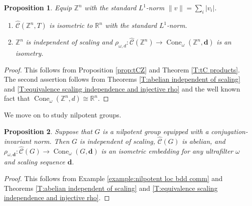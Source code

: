 \documentclass[12pt]{amsart}
\newtheorem{prop}{Proposition}[section]
\theoremstyle{definition}
\def\RR{\ensuremath{\mathbb{R}}}
\def\ZZ{\ensuremath{\mathbb{Z}}}
\newcommand{\B}[1]{\mathbf{#1}}
\newcommand{\OP}[1]{\operatorname{#1}}
\def\Cone{\OP{Cone}}
\def\tC{\hat{\mathcal{C}}}
\begin{document}
\begin{prop}\label{prop:tCZn} %
Equip $\ZZ^n$  with the standard $L^1$-norm $\| v \|=\sum_i|v_i|$.
\begin{enumerate}[label=(\alph*)]
\item
$\tC(\ZZ^n,T)$ is isometric to $\RR^n$ with the standard $L^1$-norm.
\item
$\ZZ^n$ is independent of scaling and $\rho_{\omega,d} \colon \tC(\ZZ^n) \to \Cone_\omega(\ZZ^n,\B d)$ is an isometry.
\end{enumerate}
\end{prop}

\begin{proof}
This follows from Proposition \ref{prop:tCZ} and Theorem \ref{T:tC products}.
The second assertion follows from Theorems \ref{T:abelian independent of scaling} and \ref{T:equivalence scaling independence and injective rho} and the well known fact that $\Cone_\omega(\ZZ^n,d) \cong \RR^n$.
\end{proof}








We move on to study nilpotent groups.



\begin{prop}\label{prop:cone of general nilpotent groups}
Suppose that $G$ is a nilpotent group equipped with a conjugation-invariant norm.
Then $G$ is independent of scaling, $\tC(G)$ is abelian, and $\rho_{\omega,\B d} \colon \tC(G) \to \Cone_\omega(G,\B d)$ is an isometric embedding for any ultrafilter $\omega$ and scaling sequence $\B d$.

\end{prop}


\begin{proof}
This follows from Example \ref{example:nilpotent loc bdd comm} and Theorems \ref{T:abelian independent of scaling} and \ref{T:equivalence scaling independence and injective rho}.
\end{proof}
\end{document}

